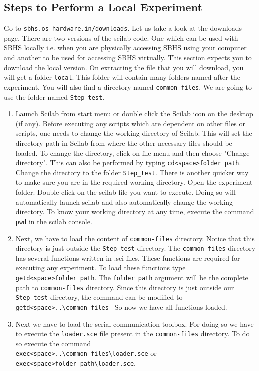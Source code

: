 \subsection{Steps to Perform a Local Experiment}\label{local-steps}
\label{scilab_sbhs}
Go to {\tt sbhs.os-hardware.in/downloads}. Let us take a look at the downloads page. There are two versions of the scilab code. One which can be used with SBHS locally i.e. when you are physically accessing SBHS using your computer and another to be used for accessing SBHS virtually. This section expects you to download the local version. On extracting the file that you will download, you will get a folder {\tt local}. This folder will contain many folders named after the experiment. You will also find a directory named {\tt common-files}. We are going to use the folder named {\tt Step\_test}.
\begin{enumerate}
\item Launch Scilab from start menu or double click the Scilab icon on the desktop (if any). Before executing any scripts which are dependent on other files or scripts, one needs to change the working directory of Scilab. This will set the directory path in Scilab from where the other necessary files should be loaded.  To change the directory, click on file menu and then choose "Change directory". This can also be performed by typing {\tt cd<space>folder path}. Change the directory to the folder  {\tt Step\_test}. There is another quicker way to make sure you are in the required working directory. Open the experiment folder. Double click on the scilab file you want to execute. Doing so will automatically launch scilab and also automatically change the working directory. To know your working directory at any time, execute the command {\tt pwd} in the scilab console. 
\item Next, we have to load the content of {\tt common-files} directory. Notice that this directory is just outside the {\tt Step\_test} directory. The  {\tt common-files} directory has several functions written in .sci files. These functions are required for executing any experiment. To load these functions type \\{\tt getd<space>folder path}. The {\tt folder path} argument will be the complete path to {\tt common-files} directory. Since this directory is just outside our {\tt Step\_test} directory, the command can be modified to \\{\tt getd<space>..\textbackslash common\_files\ } So now we have all functions loaded. 
\item Next we have to load the serial communication toolbox. For doing so we have to execute the {\tt loader.sce} file present in the {\tt common-files} directory. To do so execute the command \\{\tt exec<space>..\textbackslash common\_files\textbackslash loader.sce} or\\ {\tt exec<space>folder path\textbackslash loader.sce}. 

\end{enumerate}
